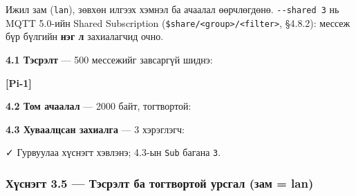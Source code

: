 Ижил зам (\texttt{lan}), зөвхөн илгээх хэмнэл ба ачаалал өөрчлөгдөнө. \texttt{-\/-shared\ 3} нь MQTT 5.0-ийн Shared Subscription (\texttt{\$share/\allowbreak{}\textless{}group\textgreater{}/\allowbreak{}\textless{}filter\textgreater{}}, §4.8.2): мессеж бүр бүлгийн \textbf{нэг л} захиалагчид очно.

\textbf{4.1 Тэсрэлт} --- 500 мессежийг завсаргүй шиднэ:

\textbf{{[}Pi-1{]}}

\begin{Shaded}
\begin{Highlighting}[]
  \KeywordTok{\textbackslash{}}
\end{Highlighting}
\end{Shaded}

\textbf{4.2 Том ачаалал} --- 2000 байт, тогтвортой:

\begin{Shaded}
\begin{Highlighting}[]
  \KeywordTok{\textbackslash{}}
\end{Highlighting}
\end{Shaded}

\textbf{4.3 Хуваалцсан захиалга} --- 3 хэрэглэгч:

\begin{Shaded}
\begin{Highlighting}[]
  \KeywordTok{\textbackslash{}}
\end{Highlighting}
\end{Shaded}

✓ Гурвуулаа хүснэгт хэвлэнэ; 4.3-ын \texttt{Sub} багана \texttt{3}.

\hypertarget{ux445ux4afux441ux43dux44dux433ux442-3.5-ux442ux44dux441ux440ux44dux43bux442-ux431ux430-ux442ux43eux433ux442ux432ux43eux440ux442ux43eux439-ux443ux440ux441ux433ux430ux43b-ux437ux430ux43c-lan}{%
\subsubsection{Хүснэгт 3.5 --- Тэсрэлт ба тогтвортой урсгал (зам = lan)}\label{ux445ux4afux441ux43dux44dux433ux442-3.5-ux442ux44dux441ux440ux44dux43bux442-ux431ux430-ux442ux43eux433ux442ux432ux43eux440ux442ux43eux439-ux443ux440ux441ux433ux430ux43b-ux437ux430ux43c-lan}}

